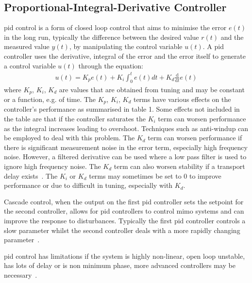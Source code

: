 \subsection{Proportional-Integral-Derivative Controller}
\gls{pid} control is a form of closed loop control that aims to minimise the error $e(t)$ in the long run, typically the difference between the desired value $r(t)$ and the measured value $y(t)$, by manipulating the control variable $u(t)$.
A \gls{pid} controller uses the derivative, integral of the error and the error itself to generate a control variable $u(t)$ through the equation:
\begin{align}
    u(t) = K_p e(t) + K_i \int_0^t e(t)dt + K_d \frac{\mathrm{d}}{\mathrm{d} t}  e(t)
\end{align}
where $K_p$, $K_i$, $K_d$ are values that are obtained from tuning and may be constant or a function, e.g. of time.
The $K_p$, $K_i$, $K_d$ terms have various effects on the controller's performance as summarised in table 1.
Some effects not included in the table are that if the controller saturates the $K_i$ term can worsen performance as the integral increases leading to overshoot. 
Techniques such as anti-windup can be employed to deal with this problem.
The $K_d$ term can worsen performance if there is significant measurement noise in the error term, especially high frequency noise.
However, a filtered derivative can be used where a low pass filter is used to ignore high frequency noise.
The $K_d$ term can also worsen stability if a transport delay exists~\cite{Li2006}.
The $K_i$ or $K_d$ terms may sometimes be set to 0 to improve performance or due to difficult in tuning, especially with $K_d$.

Cascade control, when the output on the first \gls{pid} controller sets the setpoint for the second controller, allows for \gls{pid} controllers to control \gls{mimo} systems and can improve the response to disturbances.
Typically the first \gls{pid} controller controls a slow parameter whilst the second controller deals with a more rapidly changing parameter~\cite{bolton2015}.

\Gls{pid} control has limitations if the system is highly non-linear, open loop unstable, has lots of delay or is non minimum phase, more advanced controllers may be necessary~\cite{Dou2018}.
%
\begin{figure}[h]
    \centering
    
    \caption*{\cite{Li2006}}
\end{figure}